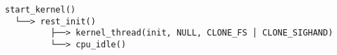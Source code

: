 \documentclass[varwidth=40em]{standalone}
\begin{document}
\begin{verbatim}
start_kernel()
  └──> rest_init()
         ├──> kernel_thread(init, NULL, CLONE_FS │ CLONE_SIGHAND)
         └──> cpu_idle()
\end{verbatim}
\end{document}
